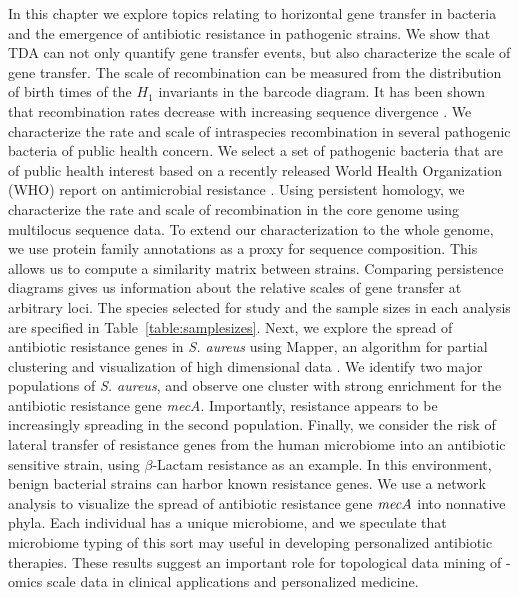 In this chapter we explore topics relating to horizontal gene transfer in bacteria and the emergence of antibiotic resistance in pathogenic strains.
We show that TDA can not only quantify gene transfer events, but also characterize the scale of gene transfer.
The scale of recombination can be measured from the distribution of birth times of the $H_1$ invariants in the barcode diagram.
It has been shown that recombination rates decrease with increasing sequence divergence \cite{Fraser:2007ep}.
We characterize the rate and scale of intraspecies recombination in several pathogenic bacteria of public health concern.
We select a set of pathogenic bacteria that are of public health interest based on a recently released World Health Organization (WHO) report on antimicrobial resistance \cite{WHO:2014wa}.
Using persistent homology, we characterize the rate and scale of recombination in the core genome using multilocus sequence data.
To extend our characterization to the whole genome, we use protein family annotations as a proxy for sequence composition.
This allows us to compute a similarity matrix between strains.
Comparing persistence diagrams gives us information about the relative scales of gene transfer at arbitrary loci.
The species selected for study and the sample sizes in each analysis are specified in Table~\ref{table:samplesizes}.
Next, we explore the spread of antibiotic resistance genes in \emph{S. aureus} using Mapper, an algorithm for partial clustering and visualization of high dimensional data \cite{Singh:2007ve}.
We identify two major populations of \emph{S. aureus}, and observe one cluster with strong enrichment for the antibiotic resistance gene \emph{mecA}.
Importantly, resistance appears to be increasingly spreading in the second population.
Finally, we consider the risk of lateral transfer of resistance genes from the human microbiome into an antibiotic sensitive strain, using $\beta$-Lactam resistance as an example.
In this environment, benign bacterial strains can harbor known resistance genes.
We use a network analysis to visualize the spread of antibiotic resistance gene $\emph{mecA}$ into nonnative phyla.
Each individual has a unique microbiome, and we speculate that microbiome typing of this sort may useful in developing personalized antibiotic therapies.
These results suggest an important role for topological data mining of -omics scale data in clinical applications and personalized medicine.

